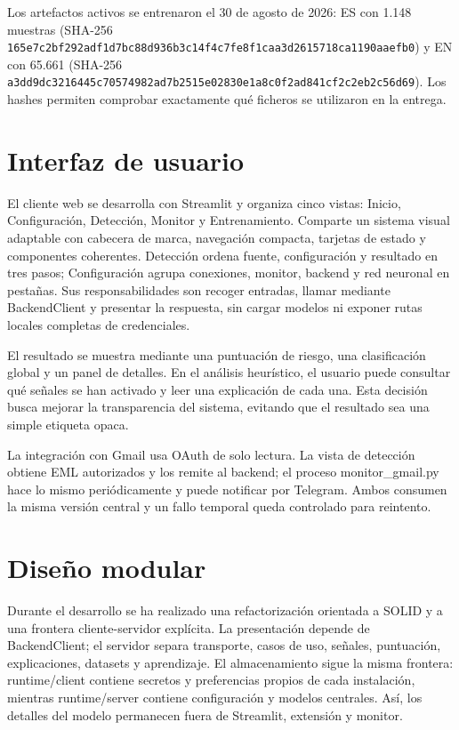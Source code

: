 \documentclass[11pt,a4paper,oneside]{report}
\begin{document}
Los artefactos activos se entrenaron el 30 de agosto de 2026: ES con 1.148 muestras (SHA-256 \nolinkurl{165e7c2bf292adf1d7bc88d936b3c14f4c7fe8f1caa3d2615718ca1190aaefb0}) y EN con 65.661 (SHA-256 \nolinkurl{a3dd9dc3216445c70574982ad7b2515e02830e1a8c0f2ad841cf2c2eb2c56d69}). Los hashes permiten comprobar exactamente qué ficheros se utilizaron en la entrega.

\section{Interfaz de usuario}

El cliente web se desarrolla con Streamlit y organiza cinco vistas: Inicio, Configuración, Detección, Monitor y Entrenamiento. Comparte un sistema visual adaptable con cabecera de marca, navegación compacta, tarjetas de estado y componentes coherentes. Detección ordena fuente, configuración y resultado en tres pasos; Configuración agrupa conexiones, monitor, backend y red neuronal en pestañas. Sus responsabilidades son recoger entradas, llamar mediante BackendClient y presentar la respuesta, sin cargar modelos ni exponer rutas locales completas de credenciales.

El resultado se muestra mediante una puntuación de riesgo, una clasificación global y un panel de detalles. En el análisis heurístico, el usuario puede consultar qué señales se han activado y leer una explicación de cada una. Esta decisión busca mejorar la transparencia del sistema, evitando que el resultado sea una simple etiqueta opaca.

La integración con Gmail usa OAuth de solo lectura. La vista de detección obtiene EML autorizados y los remite al backend; el proceso monitor\_gmail.py hace lo mismo periódicamente y puede notificar por Telegram. Ambos consumen la misma versión central y un fallo temporal queda controlado para reintento.

\section{Diseño modular}

Durante el desarrollo se ha realizado una refactorización orientada a SOLID y a una frontera cliente-servidor explícita. La presentación depende de BackendClient; el servidor separa transporte, casos de uso, señales, puntuación, explicaciones, datasets y aprendizaje. El almacenamiento sigue la misma frontera: runtime/client contiene secretos y preferencias propios de cada instalación, mientras runtime/server contiene configuración y modelos centrales. Así, los detalles del modelo permanecen fuera de Streamlit, extensión y monitor.
\end{document}
